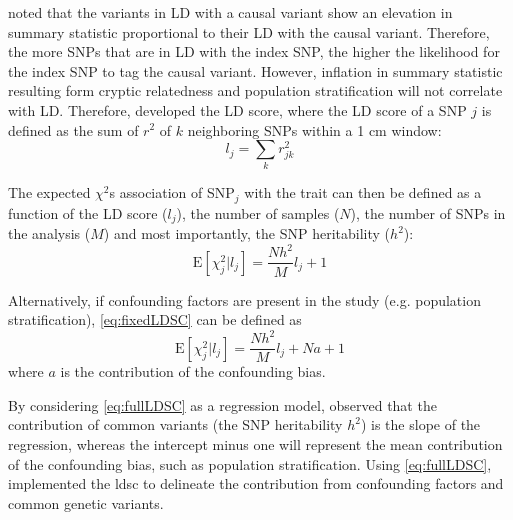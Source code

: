 \documentclass[12pt]{scrbook}
\begin{document}
\citet{Bulik-Sullivan2015} noted that the variants in \gls{LD} with a causal variant show an elevation in summary statistic proportional to their \gls{LD} with the causal variant. 
Therefore, the more \glspl{SNP} that are in \gls{LD} with the index \gls{SNP}, the higher the likelihood for the index \gls{SNP} to tag the causal variant. 
However, inflation in summary statistic resulting form cryptic relatedness and population stratification will not correlate with \gls{LD}.
Therefore, \citet{Bulik-Sullivan2015} developed the \gls{LD} score, where the \gls{LD} score of a \gls{SNP} $j$ is defined as the sum of $r^2$ of $k$ neighboring \glspl{SNP} within a 1 \gls{cm} window:
\begin{equation}
l_j = \sum_kr^2_{jk}
\label{eq:ldScore}
\end{equation}

The expected $\chi^2$s association of \gls{SNP}$_j$ with the trait can then be defined as a function of the \gls{LD} score ($l_j$), the number of samples ($N$), the number of \glspl{SNP} in the analysis ($M$) and most importantly, the \gls{SNP} heritability ($h^2$):
\begin{equation}
\mathrm{E}[\chi^2_j | l_j] = \frac{Nh^2}{M}l_j+1
\label{eq:fixedLDSC}
\end{equation}

Alternatively, if confounding factors are present in the study (e.g. population stratification), \cref{eq:fixedLDSC} can be defined as
\begin{equation}
\mathrm{E}[\chi^2_j | l_j] = \frac{Nh^2}{M}l_j+Na+1
\label{eq:fullLDSC}
\end{equation}
where $a$ is the contribution of the confounding bias.

By considering \cref{eq:fullLDSC} as a regression model, \citet{Bulik-Sullivan2015} observed that the contribution of common variants (the \gls{SNP} heritability $h^2$) is the slope of the regression, whereas the intercept minus one will represent the mean contribution of the confounding bias, such as population stratification. 
Using \cref{eq:fullLDSC}, \citet{Bulik-Sullivan2015} implemented the \gls{ldsc} to delineate the contribution from confounding factors and common genetic variants.
\end{document}
